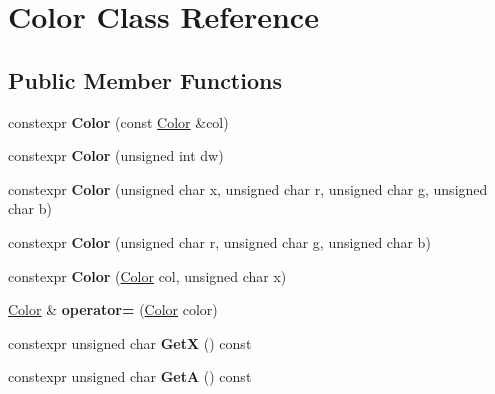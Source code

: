 \hypertarget{class_color}{}\section{Color Class Reference}
\label{class_color}
\subsection*{Public Member Functions}
\begin{DoxyCompactItemize}
\item 
\mbox{\label{class_color_aee4ab42a1616f7e0639c6cb1daa30d64}} 
constexpr {\bfseries Color} (const \hyperlink{class_color}{Color} \&col)
\item 
\mbox{\label{class_color_ac354c51018de687c5f883c3bdad7d6cd}} 
constexpr {\bfseries Color} (unsigned int dw)
\item 
\mbox{\label{class_color_aa8b0bda7bf46733f7daec168c6a209f6}} 
constexpr {\bfseries Color} (unsigned char x, unsigned char r, unsigned char g, unsigned char b)
\item 
\mbox{\label{class_color_a38a4c8384e3231bc106a9d70004e1701}} 
constexpr {\bfseries Color} (unsigned char r, unsigned char g, unsigned char b)
\item 
\mbox{\label{class_color_ae05c2cc6f91004653f8d2fb76c4fa727}} 
constexpr {\bfseries Color} (\hyperlink{class_color}{Color} col, unsigned char x)
\item 
\mbox{\label{class_color_a2f9b3488c4c8b27b2f83649a297c50e7}} 
\hyperlink{class_color}{Color} \& {\bfseries operator=} (\hyperlink{class_color}{Color} color)
\item 
\mbox{\label{class_color_a60370781fc2b718d79793b5a48e0f86a}} 
constexpr unsigned char {\bfseries GetX} () const
\item 
\mbox{\label{class_color_a196c393b4fd25f7a354555e68f102598}} 
constexpr unsigned char {\bfseries GetA} () const
\item 
\mbox{\label{class_color_a481e58f883a627ddfa9c8cdeb295891e}} 

\end{DoxyCompactItemize}
